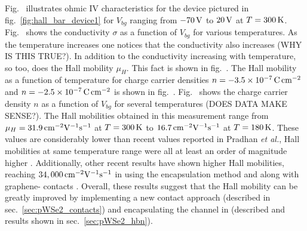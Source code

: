 \noindent Fig.~ illustrates ohmic IV characteristics for the device pictured in fig.~\ref{fig:hall_bar_device1} for $V_{bg}$ ranging from $-70\,\mathrm{V}$ to $20\,\mathrm{V}$ at $T=300\,\mathrm{K}$. Fig.~ shows the conductivity $\sigma$ as a function of $V_{bg}$ for various temperatures. As the temperature increases one notices that the conductivity also increases (WHY IS THIS TRUE?). In addition to the conductivity increasing with temperature, so too, does the Hall mobility $\mu_H$. This fact is shown in fig.~. The Hall mobility as a function of temperature for charge carrier densities $n=-3.5\times 10^{-7}\,\mathrm{C}\,\mathrm{cm}^{-2}$ and $n=-2.5\times 10^{-7}\,\mathrm{C}\,\mathrm{cm}^{-2}$ is shown in fig.~. Fig.~ shows the charge carrier density $n$ as a function of $V_{bg}$ for several temperatures (DOES DATA MAKE SENSE?). The Hall mobilities obtained in this measurement range from $\mu_H=31.9\,\mathrm{cm}^{-2}\mathrm{V}^{-1}\mathrm{s}^{-1}$ at $T=300\,\mathrm{K}$ to $16.7\,\mathrm{cm}^{-2}\mathrm{V}^{-1}\mathrm{s}^{-1}$ at $T=180\,\mathrm{K}$. These values are considerably lower than recent values reported in Pradhan \emph{et al.}, Hall mobilities at same temperature range were all at least an order of magnitude higher \cite{Pradhan_SciReports2015}. Additionally, other recent results have shown higher Hall mobilities, reaching $34,000\,\mathrm{cm}^{-2}\mathrm{V}^{-1}\mathrm{s}^{-1}$ in  using the \hbn encapsulation method and  along with graphene- contacts \cite{Li_NatureNano2015}. Overall, these results suggest that the Hall mobility can be greatly improved by implementing a new contact approach (described in sec.~\ref{sec:pWSe2_contacts}) and encapsulating the channel in \hbn (described and results shown in sec.~\ref{sec:pWSe2_hbn}). 


